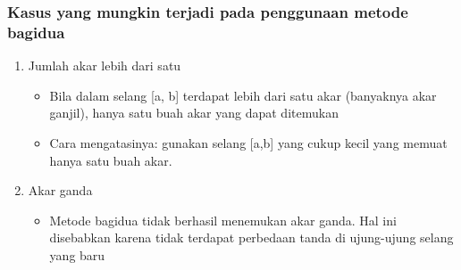 \documentclass[pdflatex,compress]{beamer}
\begin{document}
\begin{frame}
	\frametitle{Kasus yang mungkin terjadi pada penggunaan metode bagidua}
	\begin{enumerate}
		\item Jumlah akar lebih dari satu
		\begin{itemize}
			\item Bila dalam selang [a, b] terdapat lebih dari satu akar (banyaknya akar ganjil), hanya satu buah akar yang dapat ditemukan
			\item Cara mengatasinya: gunakan selang [a,b] yang cukup kecil yang memuat hanya satu buah akar.
		\end{itemize}
		\item Akar ganda
		\begin{itemize}
			\item Metode bagidua tidak berhasil menemukan akar ganda. Hal ini disebabkan karena tidak terdapat perbedaan tanda di ujung-ujung selang yang baru
		\end{itemize}
	\end{enumerate}
\end{frame}
\end{document}
